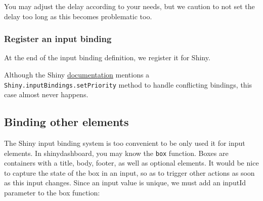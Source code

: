 \documentclass[
]{book}
\newenvironment{Shaded}{\begin{snugshade}}{\end{snugshade}}
\newcommand{\AttributeTok}[1]{\textcolor[rgb]{0.77,0.63,0.00}{#1}}
\newcommand{\CommentTok}[1]{\textcolor[rgb]{0.56,0.35,0.01}{\textit{#1}}}
\newcommand{\KeywordTok}[1]{\textcolor[rgb]{0.13,0.29,0.53}{\textbf{#1}}}
\newcommand{\NormalTok}[1]{#1}
\newcommand{\OperatorTok}[1]{\textcolor[rgb]{0.81,0.36,0.00}{\textbf{#1}}}
\newcommand{\StringTok}[1]{\textcolor[rgb]{0.31,0.60,0.02}{#1}}
\newcommand{\VariableTok}[1]{\textcolor[rgb]{0.00,0.00,0.00}{#1}}
\begin{document}
You may adjust the delay according to your needs, but we caution to not set the delay too long as this becomes problematic too.

\hypertarget{register-an-input-binding}{%
\subsubsection{Register an input binding}\label{register-an-input-binding}}

At the end of the input binding definition, we register it for Shiny.

\begin{Shaded}
\end{Shaded}

Although the Shiny \href{https://shiny.rstudio.com/articles/building-inputs.html}{documentation} mentions a \texttt{Shiny.inputBindings.setPriority} method to handle conflicting bindings, this case almost never happens.

\hypertarget{binding-other-elements}{%
\subsection{Binding other elements}\label{binding-other-elements}}

The Shiny input binding system is too convenient to be only used it for input elements. In shinydashboard, you may know the \texttt{box} function. Boxes are containers with a title, body, footer, as well as optional elements. It would be nice to capture the state of the box in an input, so as to trigger other actions as soon as this input changes. Since an input value is unique, we must add an inputId parameter to the box function:
\end{document}
